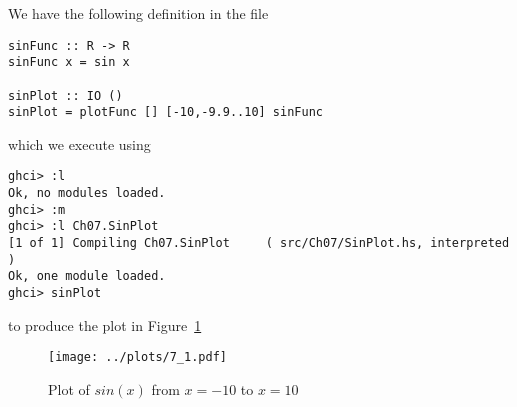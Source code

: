 
We have the following definition in the file 
\begin{verbatim}
sinFunc :: R -> R
sinFunc x = sin x

sinPlot :: IO ()
sinPlot = plotFunc [] [-10,-9.9..10] sinFunc 
\end{verbatim}
which we execute using
\begin{verbatim}
ghci> :l
Ok, no modules loaded.
ghci> :m
ghci> :l Ch07.SinPlot
[1 of 1] Compiling Ch07.SinPlot     ( src/Ch07/SinPlot.hs, interpreted )
Ok, one module loaded.
ghci> sinPlot
\end{verbatim}
to produce the plot in Figure~\ref{7_1}

\begin{figure}
    \texttt{[image: ../plots/7\_1.pdf]}
    \caption{Plot of $sin(x)$ from $x = -10$ to $x = 10$ \label{7_1}} 
\end{figure}
